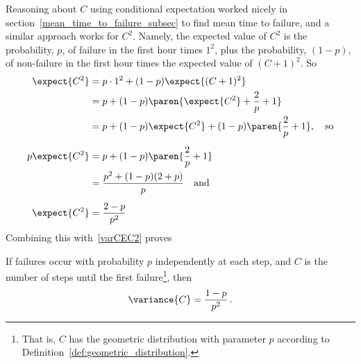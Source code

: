 Reasoning about $C$ using conditional expectation worked nicely in
section~\ref{mean_time_to_failure_subsec} to find mean time to
failure, and a similar approach works for $C^2$.  Namely, the expected
value of $C^2$ is the probability, $p$, of failure in the first hour
times $1^2$, plus the probability, $(1-p)$, of non-failure in the
first hour times the expected value of $(C+1)^2$.  So
\begin{align*}
\expect{C^2} & = p\cdot 1^2 + (1-p)\expect{(C+1)^2}\\
             & = p + (1-p) \paren{\expect{C^2} + \frac{2}{p} +1}\\
             & = p+ (1-p)\expect{C^2} + (1-p)\paren{\frac{2}{p} + 1},
                \quad\text{so}\\[5pt]
p \expect{C^2} & = p+ (1-p)\paren{\frac{2}{p} + 1}\\
               & = \frac{p^2+(1-p)(2+p)}{p} \quad\text{and}\\[5pt]
\expect{C^2} & = \frac{2 -p}{p^2} %
\end{align*}
Combining this with~\eqref{varCEC2} proves
\begin{lemma}\label{lem:var_time_to_fail}
If failures occur with probability $p$ independently at each step, and
$C$ is the number of steps until the first failure\footnote{That is,
  $C$ has the geometric distribution with parameter $p$ according to
  Definition~\ref{def:geometric_distribution}.}, then
\begin{equation}\label{var_time_to_fail}
\variance{C} = \frac{1-p}{p^2} \,.
\end{equation}
\end{lemma}

